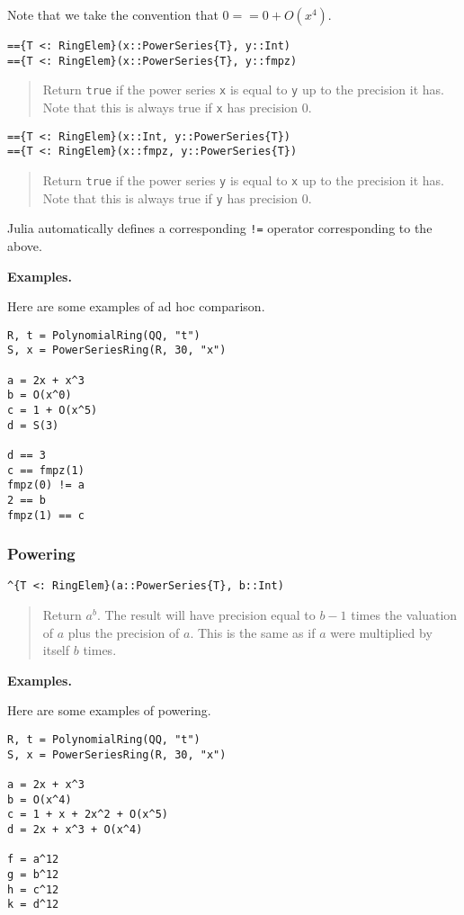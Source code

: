 \documentclass[a4paper,10pt]{article}
\newcommand{\code}{\lstinline}
\newcommand{\desc}[1]{\vspace{-3mm}\begin{quote}#1\end{quote}}
\begin{document}
Note that we take the convention that $0 == 0 + O(x^4)$.

\begin{lstlisting}
=={T <: RingElem}(x::PowerSeries{T}, y::Int)
=={T <: RingElem}(x::PowerSeries{T}, y::fmpz)
\end{lstlisting}

\desc{Return \code{true} if the power series \code{x} is equal to \code{y} up
to the precision it has. Note that this is always true if \code{x} has
precision $0$.}

\begin{lstlisting}
=={T <: RingElem}(x::Int, y::PowerSeries{T})
=={T <: RingElem}(x::fmpz, y::PowerSeries{T})
\end{lstlisting}

\desc{Return \code{true} if the power series \code{y} is equal to \code{x} up
to the precision it has. Note that this is always true if \code{y} has
precision $0$.}

Julia automatically defines a corresponding \code{!=} operator corresponding to
the above.

\textbf{Examples.}

Here are some examples of ad hoc comparison.

\begin{lstlisting}
R, t = PolynomialRing(QQ, "t")
S, x = PowerSeriesRing(R, 30, "x")

a = 2x + x^3
b = O(x^0)
c = 1 + O(x^5)
d = S(3)

d == 3
c == fmpz(1)
fmpz(0) != a
2 == b
fmpz(1) == c
\end{lstlisting}

\subsubsection{Powering}

\begin{lstlisting}
^{T <: RingElem}(a::PowerSeries{T}, b::Int)
\end{lstlisting}

\desc{Return $a^b$. The result will have precision equal to $b - 1$ times the
valuation of $a$ plus the precision of $a$. This is the same as if $a$ were
multiplied by itself $b$ times.}

\textbf{Examples.}

Here are some examples of powering.

\begin{lstlisting}
R, t = PolynomialRing(QQ, "t")
S, x = PowerSeriesRing(R, 30, "x")

a = 2x + x^3
b = O(x^4)
c = 1 + x + 2x^2 + O(x^5)
d = 2x + x^3 + O(x^4)

f = a^12
g = b^12
h = c^12
k = d^12
\end{lstlisting}
\end{document}
